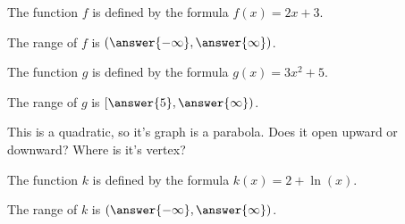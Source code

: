 \documentclass{ximera}
\author{Bobby Ramsey}
\begin{document}
\begin{exercise} 
	The function $f$ is defined by the formula $f(x)=2x+3$.
	\begin{center}
		The range of $f$ is $(\answer{-\infty},\answer{\infty})$.
	\end{center}
\end{exercise}

\begin{exercise} 
	The function $g$ is defined by the formula $g(x)=3x^2+5$.
	\begin{center}
		The range of $g$ is $[\answer{5},\answer{\infty})$.
		\begin{hint}
			This is a quadratic, so it's graph is a parabola. Does it open upward or downward? Where is it's vertex?
		\end{hint}
	\end{center}
\end{exercise}

\begin{exercise} 
	The function $k$ is defined by the formula $k(x)=2+\ln(x)$.
	\begin{center}
		The range of $k$ is $(\answer{-\infty},\answer{\infty})$.
		\begin{hint}
		\end{hint}
	\end{center}
\end{exercise}
\end{document}
